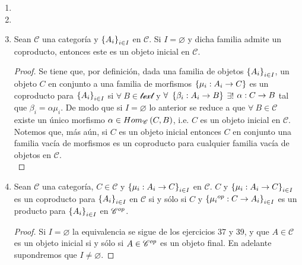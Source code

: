 \documentclass{article}
\begin{document}
\begin{enumerate}[label=\textbf{Ej \arabic*.}]
\begin{proof}
			\begin{align*}
				\mu\simeq Im\lrprth{\mu}\simeq Ker\lrprth{Coker\lrprth{\mu}}\simeq Ker\lrprth{c_{\mu}}, && \text{en }\moncategory{\mathscr{C}}{B}
			\end{align*}
			(pues  $\mathscr{C}$ es exacta y $\mu$ es mono) garantiza que por medio de la propiedad universal del kernel $\exists !$ $\catarrow{\rho}{Ker\lrprth{\theta}}{B'}{}$ tal que $fk_{\theta}=\rho\mu$, i.e. el siguiente diagrama conmuta
			\begin{center}
			\end{center}
			y así se tiene lo deseado.\\
		\end{proof}
		\item 
		\item 
		\item Sean $\mathscr{C}$ una categoría y $\left\{A_i\right\}_{i\in I}$ en $\mathscr{C}$. Si $I=\varnothing$ y dicha familia admite un coproducto, entonces este es un objeto inicial en $\mathscr{C}$.
		\begin{proof}
			Se tiene que, por definición, dada una familia de objetos ${\left\{{A}_{i}\right\}}_{i\in I}$, un objeto $C$ en conjunto a una familia de morfismos $\lrbrack{\catarrow{\mu_i}{A_i}{C}{}}$ es un coproducto para ${\left\{{A}_{i}\right\}}_{i\in I}$ si $\forall\ B\in\mathscr{text}$ y $\forall\ \lrbrack{\catarrow{\beta_i}{A_i}{B}{}}$ $\exists !$ $\catarrow{\alpha}{C}{B}{}$ tal que $\beta_i=\alpha\mu_i$. De modo que si $I=\varnothing$ lo anterior se reduce a que $\forall\ B\in\mathscr{C}$ existe un único morfismo $\alpha\in Hom_{\mathscr{C}}\left(C,B\right)$, i.e. $C$ es un objeto inicial en $\mathscr{C}$.\\
			Notemos que, más aún, si $C$ es un objeto inicial entonces $C$ en conjunto una familia vacía de morfismos es un coproducto para cualquier familia vacía de objetos en $\mathscr{C}$.\\
		\end{proof}
		\item  Sean $\mathscr{C}$ una categoría, $C\in\mathscr{C}$ y $\lrbrack{\catarrow{\mu_i}{A_i}{C}{}}_{\copyandpaste}$ en $\mathscr{C}$.  $C$ y $\lrbrack{\catarrow{\mu_i}{A_i}{C}{}}_{\copyandpaste}$ es un coproducto para $\left\{A_i\right\}_{i\in I}$ en $\mathscr{C}$ si y sólo si $C$ y $\lrbrack{\catarrow{\opst{\mu_i}}{C}{A_i}{}}_{\copyandpaste}$ es un producto para $\left\{A_i\right\}_{i\in I}$ en ${\mathscr{C}}^{op}$.
		\begin{proof}
			Si $I=\varnothing$ la equivalencia se sigue de los ejercicios 37 y 39, y que $A\in\mathscr{C}$ es un objeto inicial si y sólo si $A\in{\mathscr{C}}^{op}$ es un objeto final. En adelante supondremos que $I\neq\varnothing$.
						

\end{proof}
\end{enumerate}
\end{document}
